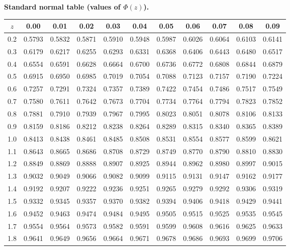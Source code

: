 	\noindent\textbf{Standard normal table (values of \(\Phi(z)\)).}
	\begin{center}\footnotesize
		\begin{tabular}{c|cccccccccc}
			\(z\) & 0.00 & 0.01 & 0.02 & 0.03 & 0.04 & 0.05 & 0.06 & 0.07 & 0.08 & 0.09\\\hline
			0.2 & 0.5793 & 0.5832 & 0.5871 & 0.5910 & 0.5948 & 0.5987 & 0.6026 & 0.6064 & 0.6103 & 0.6141\\
			0.3 & 0.6179 & 0.6217 & 0.6255 & 0.6293 & 0.6331 & 0.6368 & 0.6406 & 0.6443 & 0.6480 & 0.6517\\
			0.4 & 0.6554 & 0.6591 & 0.6628 & 0.6664 & 0.6700 & 0.6736 & 0.6772 & 0.6808 & 0.6844 & 0.6879\\
			0.5 & 0.6915 & 0.6950 & 0.6985 & 0.7019 & 0.7054 & 0.7088 & 0.7123 & 0.7157 & 0.7190 & 0.7224\\
			0.6 & 0.7257 & 0.7291 & 0.7324 & 0.7357 & 0.7389 & 0.7422 & 0.7454 & 0.7486 & 0.7517 & 0.7549\\
			0.7 & 0.7580 & 0.7611 & 0.7642 & 0.7673 & 0.7704 & 0.7734 & 0.7764 & 0.7794 & 0.7823 & 0.7852\\
			0.8 & 0.7881 & 0.7910 & 0.7939 & 0.7967 & 0.7995 & 0.8023 & 0.8051 & 0.8078 & 0.8106 & 0.8133\\
			0.9 & 0.8159 & 0.8186 & 0.8212 & 0.8238 & 0.8264 & 0.8289 & 0.8315 & 0.8340 & 0.8365 & 0.8389\\
			1.0 & 0.8413 & 0.8438 & 0.8461 & 0.8485 & 0.8508 & 0.8531 & 0.8554 & 0.8577 & 0.8599 & 0.8621\\
			1.1 & 0.8643 & 0.8665 & 0.8686 & 0.8708 & 0.8729 & 0.8749 & 0.8770 & 0.8790 & 0.8810 & 0.8830\\
			1.2 & 0.8849 & 0.8869 & 0.8888 & 0.8907 & 0.8925 & 0.8944 & 0.8962 & 0.8980 & 0.8997 & 0.9015\\
			1.3 & 0.9032 & 0.9049 & 0.9066 & 0.9082 & 0.9099 & 0.9115 & 0.9131 & 0.9147 & 0.9162 & 0.9177\\
			1.4 & 0.9192 & 0.9207 & 0.9222 & 0.9236 & 0.9251 & 0.9265 & 0.9279 & 0.9292 & 0.9306 & 0.9319\\
			1.5 & 0.9332 & 0.9345 & 0.9357 & 0.9370 & 0.9382 & 0.9394 & 0.9406 & 0.9418 & 0.9429 & 0.9441\\
			1.6 & 0.9452 & 0.9463 & 0.9474 & 0.9484 & 0.9495 & 0.9505 & 0.9515 & 0.9525 & 0.9535 & 0.9545\\
			1.7 & 0.9554 & 0.9564 & 0.9573 & 0.9582 & 0.9591 & 0.9599 & 0.9608 & 0.9616 & 0.9625 & 0.9633\\
			1.8 & 0.9641 & 0.9649 & 0.9656 & 0.9664 & 0.9671 & 0.9678 & 0.9686 & 0.9693 & 0.9699 & 0.9706\\

\end{tabular}
\end{center}
